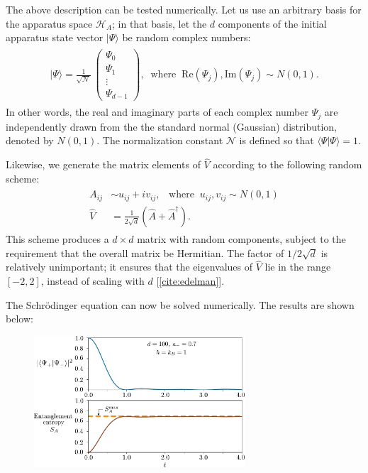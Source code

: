 \documentclass[pra,12pt]{revtex4}
\begin{document}
The above description can be tested numerically.  Let us use an
arbitrary basis for the apparatus space $\mathscr{H}_A$; in that
basis, let the $d$ components of the initial apparatus state vector
$|\Psi\rangle$ be random complex numbers:
\begin{align}
  \begin{aligned}
  |\Psi\rangle = \frac{1}{\sqrt{\mathcal{N}}}\, \begin{pmatrix}\Psi_0 \\ \Psi_1 \\ \vdots \\ \Psi_{d-1}
  \end{pmatrix}, \;\; \mathrm{where} \;\; \mathrm{Re}(\Psi_j), \mathrm{Im}(\Psi_j) \sim N(0,1).
  \end{aligned}
\end{align}
In other words, the real and imaginary parts of each complex number
$\Psi_j$ are independently drawn from the the standard normal
(Gaussian) distribution, denoted by $N(0,1)$.  The normalization
constant $\mathcal{N}$ is defined so that $\langle\Psi|\Psi\rangle =
1$.

Likewise, we generate the matrix elements of $\hat{V}$ according to
the following random scheme:
\begin{align}
  \begin{aligned}A_{ij} &\sim u_{ij} + i v_{ij}, \;\;\;\mathrm{where}\;\;u_{ij},v_{ij}\sim N(0,1)\\ \hat{V} &= \frac{1}{2\sqrt{d}} \left(\hat{A} + \hat{A}^\dagger\right).\end{aligned}
\end{align}
This scheme produces a $d\times d$ matrix with random components,
subject to the requirement that the overall matrix be Hermitian.  The
factor of $1/2\sqrt{d}$ is relatively unimportant; it ensures that the
eigenvalues of $\hat{V}$ lie in the range $[-2,2]$, instead of scaling
with $d$ [\ref{cite:edelman}].

The Schr\"odinger equation can now be solved numerically.  The results
are shown below:

\begin{figure}[h]
  \centering\includegraphics[width=0.7\textwidth]{decoherence}
\end{figure}
\end{document}
